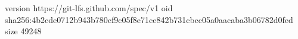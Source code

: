 version https://git-lfs.github.com/spec/v1
oid sha256:4b2cde0712b943b780cf9c05f8e71ce842b731cbcc05a0aacaba3b06782d0fed
size 49248
